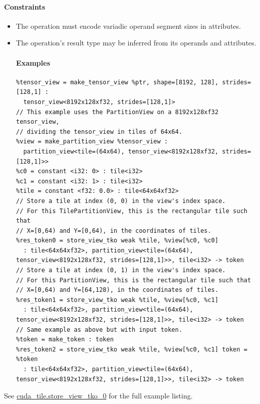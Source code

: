 \documentclass{article}
\begin{document}
\paragraph{Constraints}

\begin{itemize}
\item The operation must encode variadic operand segment sizes in attributes.
\item The operation's result type may be inferred from its operands and attributes.


\paragraph{Examples}

\begin{lstlisting}
%tensor_view = make_tensor_view %ptr, shape=[8192, 128], strides=[128,1] :
  tensor_view<8192x128xf32, strides=[128,1]>
// This example uses the PartitionView on a 8192x128xf32 tensor_view,
// dividing the tensor_view in tiles of 64x64.
%view = make_partition_view %tensor_view :
  partition_view<tile=(64x64), tensor_view<8192x128xf32, strides=[128,1]>>
%c0 = constant <i32: 0> : tile<i32>
%c1 = constant <i32: 1> : tile<i32>
%tile = constant <f32: 0.0> : tile<64x64xf32>
// Store a tile at index (0, 0) in the view's index space.
// For this TilePartitionView, this is the rectangular tile such that
// X=[0,64) and Y=[0,64), in the coordinates of tiles.
%res_token0 = store_view_tko weak %tile, %view[%c0, %c0]
  : tile<64x64xf32>, partition_view<tile=(64x64), tensor_view<8192x128xf32, strides=[128,1]>>, tile<i32> -> token
// Store a tile at index (0, 1) in the view's index space.
// For this PartitionView, this is the rectangular tile such that
// X=[0,64) and Y=[64,128), in the coordinates of tiles.
%res_token1 = store_view_tko weak %tile, %view[%c0, %c1]
  : tile<64x64xf32>, partition_view<tile=(64x64), tensor_view<8192x128xf32, strides=[128,1]>>, tile<i32> -> token
// Same example as above but with input token.
%token = make_token : token
%res_token2 = store_view_tko weak %tile, %view[%c0, %c1] token = %token
  : tile<64x64xf32>, partition_view<tile=(64x64), tensor_view<8192x128xf32, strides=[128,1]>>, tile<i32> -> token
\end{lstlisting}

\end{itemize}
See \href{https://docs.nvidia.com/cuda/tile-ir/latest/sections/appendix.html#example-cuda-tile-store-view-tko-0}{cuda\_tile.store\_view\_tko\_0} for the full example listing.
\end{document}
